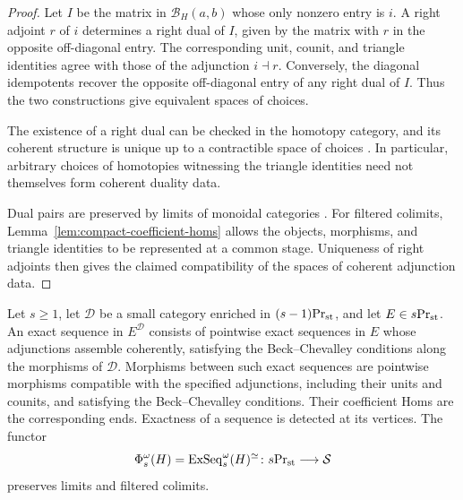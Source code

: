 \begin{proof}
Let $I$ be the matrix in $\mathcal B_H(a,b)$ whose only
nonzero entry is $i$. A right adjoint $r$ of $i$
determines a right dual of $I$, given by the matrix
with $r$ in the opposite off-diagonal entry.
The corresponding unit, counit, and triangle identities
agree with those of the adjunction $i\dashv r$.
Conversely, the diagonal idempotents recover the
opposite off-diagonal entry of any right dual of $I$.
Thus the two constructions give equivalent spaces
of choices.

The existence of a right dual can be checked in the
homotopy category, and its coherent structure is
unique up to a contractible space of choices
\citep[Lemmas~4.6.1.6 and~4.6.1.10]{LurieHA}.
In particular, arbitrary choices of homotopies
witnessing the triangle identities need not themselves
form coherent duality data.

Dual pairs are preserved by limits of monoidal
categories \citep[Proposition~4.6.1.11]{LurieHA}.
For filtered colimits, Lemma~\ref{lem:compact-coefficient-homs}
allows the objects, morphisms, and triangle identities
to be represented at a common stage.
Uniqueness of right adjoints then gives the claimed
compatibility of the spaces of coherent adjunction data.
\end{proof}





\begin{lemma}\label{lem:exact-row-structure}\label{lem:fnd-parameters}

Let $s\geq1$, let $\mathcal D$ be a small category
enriched in ${(s-1)}\mathrm{Pr}_{\mathrm{st}}$, and let $E\in{s}\mathrm{Pr}_{\mathrm{st}}$.
An exact sequence in $E^{\mathcal D}$ consists of
pointwise exact sequences in $E$ whose adjunctions
assemble coherently, satisfying the Beck--Chevalley
conditions along the morphisms of $\mathcal D$.
Morphisms between such exact sequences are pointwise
morphisms compatible with the specified adjunctions,
including their units and counits, and satisfying the
Beck--Chevalley conditions.
Their coefficient Homs are the corresponding
ends. Exactness of a sequence is detected
at its vertices. The functor
\[
 \Phi_s^\omega(H)=\operatorname{ExSeq}_s^\omega(H)^\simeq
       \colon{s}\mathrm{Pr}_{\mathrm{st}}\longrightarrow\mathcal S
\]
preserves limits and filtered colimits.
\end{lemma}


